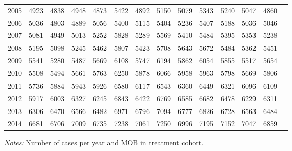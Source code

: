 \begin{table}[H]
\begin{threeparttable}
{\begin{tabular}{l*{13}{c}}
2005        &        4923&        4838&        4948&        4873&        5422&        4892&        5150&        5079&        5343&        5240&        5047&        4860\\
2006        &        5036&        4803&        4889&        5056&        5400&        5115&        5404&        5236&        5407&        5188&        5036&        5046\\
2007        &        5081&        4949&        5013&        5252&        5828&        5289&        5569&        5410&        5484&        5395&        5353&        5238\\
2008        &        5195&        5098&        5245&        5462&        5807&        5423&        5708&        5643&        5672&        5484&        5362&        5451\\
2009        &        5541&        5280&        5487&        5669&        6108&        5747&        6194&        5862&        6054&        5855&        5517&        5654\\
2010        &        5508&        5494&        5661&        5763&        6250&        5878&        6066&        5958&        5963&        5798&        5669&        5806\\
2011        &        5736&        5884&        5943&        5926&        6580&        6117&        6543&        6360&        6449&        6321&        6096&        6109\\
2012        &        5917&        6003&        6327&        6245&        6843&        6422&        6769&        6585&        6682&        6478&        6229&        6311\\
2013        &        6306&        6470&        6566&        6482&        6971&        6796&        7094&        6777&        6826&        6728&        6563&        6484\\
2014        &        6681&        6706&        7009&        6735&        7238&        7061&        7250&        6996&        7195&        7152&        7047&        6859\\
 \bottomrule \end{tabular} } \begin{tablenotes} \item \scriptsize \emph{Notes:} Number of cases per year and MOB in treatment cohort. \end{tablenotes} \end{threeparttable} \end{table} 
